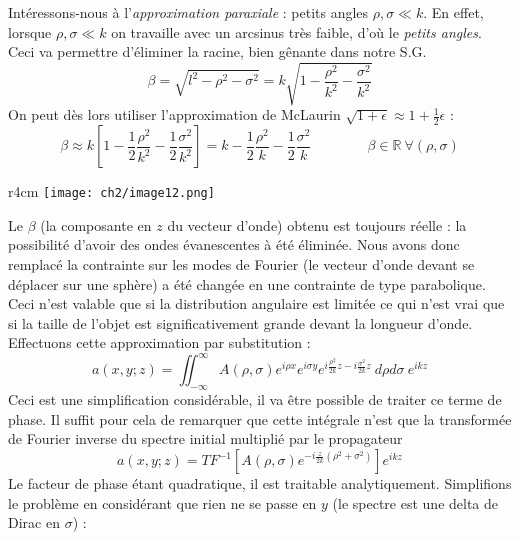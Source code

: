 Intéressons-nous à l'\textit{approximation paraxiale} : petits angles $\rho,\sigma\ll k$. 
En effet, lorsque $\rho,\sigma\ll k$ on travaille avec un arcsinus très faible, d'où le 
\textit{petits angles}. Ceci va permettre d'éliminer la racine, bien gênante dans notre 
S.G.
\begin{equation}
\beta = \sqrt{l^2-\rho^2-\sigma^2} = k\sqrt{1-\dfrac{\rho^2}{k^2}-\dfrac{\sigma^2}{k^2}}
\end{equation}
On peut dès lors utiliser l'approximation de McLaurin $\sqrt{1+\epsilon} \approx 1+\frac{1
}{2}\epsilon$ :
\begin{equation}
\beta \approx k\left[1-\dfrac{1}{2}\frac{\rho^2}{k^2}-\dfrac{1}{2}\dfrac{\sigma^2}{k^2}\right] =
k-\dfrac{1}{2}\dfrac{\rho^2}{k}-\dfrac{1}{2}\dfrac{\sigma^2}{k}\qquad\qquad\beta \in\mathbb{R}
\ \forall (\rho,\sigma)
\end{equation}
\begin{wrapfigure}[8]{r}{4cm}
\vspace{-4mm}
\texttt{[image: ch2/image12.png]}
\end{wrapfigure}
Le $\beta$ (la composante en $z$ du vecteur d'onde) obtenu est toujours réelle : la possibilité 
d'avoir des ondes évanescentes à été éliminée. Nous avons donc remplacé la contrainte sur 
les modes de Fourier (le vecteur d'onde devant se déplacer sur une sphère) a été changée en 
une contrainte de type parabolique. Ceci n'est valable que si la distribution angulaire est 
limitée ce qui n'est vrai que si la taille de l'objet est significativement grande devant la 
longueur d'onde.\\
Effectuons cette approximation par substitution :
\begin{equation}
a(x,y;z) = \iint_{-\infty}^\infty A(\rho,\sigma)e^{i\rho x}e^{i\sigma y} e^{i\frac{\rho^2}{2k}z
-i\frac{\sigma^2}{2k}z}\ d\rho d\sigma\ e^{ikz}
\end{equation}
Ceci est une simplification considérable, il va être possible de traiter ce terme de phase. Il 
suffit pour cela de remarquer que cette intégrale n'est que la transformée de Fourier inverse 
du spectre initial multiplié par le propagateur
\begin{equation}
a(x,y;z) = TF^{-1}\left[A(\rho,\sigma)e^{-i\frac{z}{2k}(\rho^2+\sigma^2)}\right]e^{ikz}
\end{equation}
Le facteur de phase étant quadratique, il est traitable analytiquement. Simplifions le problème 
en considérant que rien ne se passe en $y$ (le spectre est une delta de Dirac en $\sigma$) :
